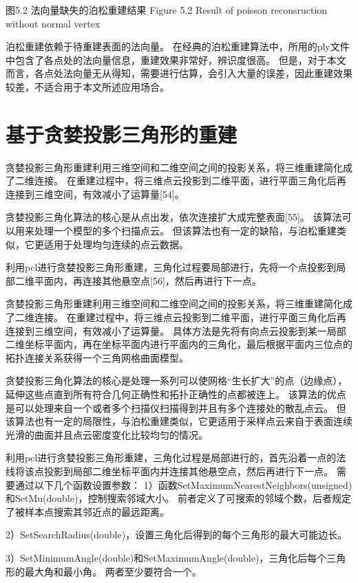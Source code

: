  
图5.2  法向量缺失的泊松重建结果
Figure 5.2 Result of poisson reconsruction without normal vertex

泊松重建依赖于待重建表面的法向量。
在经典的泊松重建算法中，所用的ply文件中包含了各点处的法向量信息，重建效果非常好，辨识度很高。
但是，对于本文而言，各点处法向量无从得知，需要进行估算，会引入大量的误差，因此重建效果较差，不适合用于本文所述应用场合。

\section{基于贪婪投影三角形的重建}
贪婪投影三角形重建利用三维空间和二维空间之间的投影关系，将三维重建简化成了二维连接。
在重建过程中，将三维点云投影到二维平面，进行平面三角化后再连接到三维空间，有效减小了运算量[54]。

贪婪投影三角化算法的核心是从点出发，依次连接扩大成完整表面[55]。
该算法可以用来处理一个模型的多个扫描点云。
但该算法也有一定的缺陷，与泊松重建类似，它更适用于处理均匀连续的点云数据。

利用pcl进行贪婪投影三角形重建，三角化过程要局部进行，先将一个点投影到局部二维平面内，再连接其他悬空点[56]，然后再进行下一点。

贪婪投影三角形重建利用三维空间和二维空间之间的投影关系，将三维重建简化成了二维连接。
在重建过程中，将三维点云投影到二维平面，进行平面三角化后再连接到三维空间，有效减小了运算量。
具体方法是先将有向点云投影到某一局部二维坐标平面内，再在坐标平面内进行平面内的三角化，最后根据平面内三位点的拓扑连接关系获得一个三角网格曲面模型。

贪婪投影三角化算法的核心是处理一系列可以使网格“生长扩大”的点（边缘点），延伸这些点直到所有符合几何正确性和拓扑正确性的点都被连上。
该算法的优点是可以处理来自一个或者多个扫描仪扫描得到并且有多个连接处的散乱点云。
但该算法也有一定的局限性，与泊松重建类似，它更适用于采样点云来自于表面连续光滑的曲面并且点云密度变化比较均匀的情况。

利用pcl进行贪婪投影三角形重建，三角化过程是局部进行的，首先沿着一点的法线将该点投影到局部二维坐标平面内并连接其他悬空点，然后再进行下一点。
需要通过以下几个函数设置参数：
1）函数SetMaximumNearestNeighbors(unsigned)和SetMu(double)，控制搜索邻域大小。
前者定义了可搜索的邻域个数，后者规定了被样本点搜索其邻近点的最远距离。

2）SetSearchRadius(double)，设置三角化后得到的每个三角形的最大可能边长。

3）SetMinimumAngle(double)和SetMaximumAngle(double)，三角化后每个三角形的最大角和最小角。
两者至少要符合一个。

